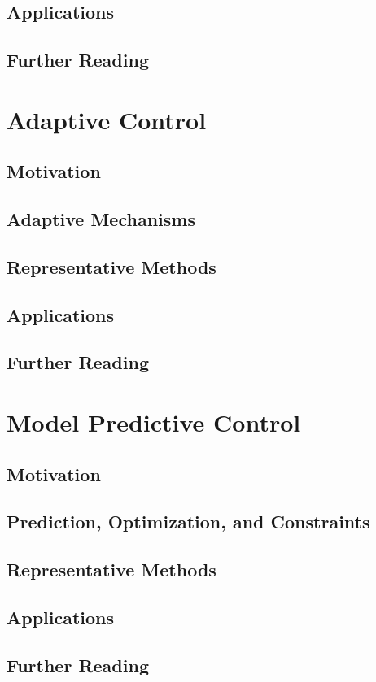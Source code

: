     		\subsection{Applications}

    		\subsection{Further Reading}


	\section{Adaptive Control} \label{ch:adaptive}

    		\subsection{Motivation}

    		\subsection{Adaptive Mechanisms}

    		\subsection{Representative Methods}

    		\subsection{Applications}

    		\subsection{Further Reading}


	\section{Model Predictive Control} \label{ch:mpc}

    		\subsection{Motivation}

    		\subsection{Prediction, Optimization, and Constraints}

    		\subsection{Representative Methods}

    		\subsection{Applications}

    		\subsection{Further Reading}